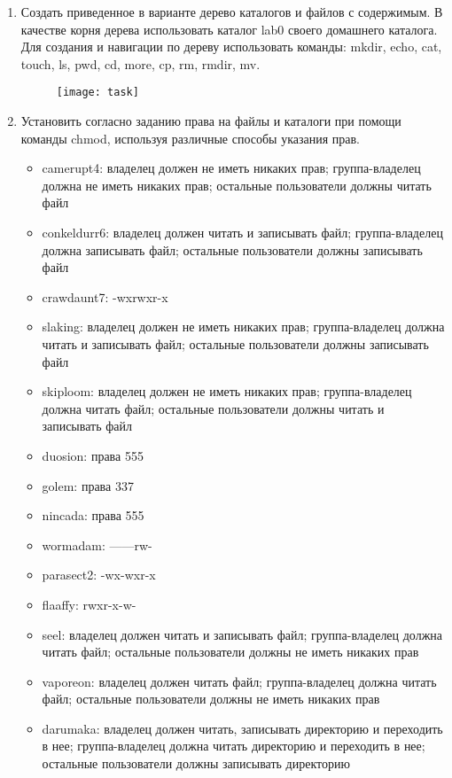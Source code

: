 \begin{enumerate}
	\item Создать приведенное в варианте дерево каталогов и файлов с содержимым. В качестве корня дерева использовать каталог lab0 своего домашнего каталога. Для создания и навигации по дереву использовать команды: mkdir, echo, cat, touch, ls, pwd, cd, more, cp, rm, rmdir, mv.
	\begin{figure}[h]
		\centering
		\texttt{[image: task]}
	\end{figure}
	
	\item Установить согласно заданию права на файлы и каталоги при помощи команды chmod, используя различные способы указания прав.
	\begin{itemize}
		\item camerupt4: владелец должен не иметь никаких прав; группа-владелец должна не иметь никаких прав; остальные пользователи должны читать файл
		 \item conkeldurr6: владелец должен читать и записывать файл; группа-владелец должна записывать файл; остальные пользователи должны записывать файл
		 \item crawdaunt7: -wxrwxr-x
		 \item slaking: владелец должен не иметь никаких прав; группа-владелец должна читать и записывать файл; остальные пользователи должны записывать файл
		 \item skiploom: владелец должен не иметь никаких прав; группа-владелец должна читать файл; остальные пользователи должны читать и записывать файл
		 \item duosion: права 555
		 \item golem: права 337
		 \item nincada: права 555
		 \item wormadam: ------rw-
		 \item parasect2: -wx-wxr-x
		 \item flaaffy: rwxr-x-w-
		 \item seel: владелец должен читать и записывать файл; группа-владелец должна читать файл; остальные пользователи должны не иметь никаких прав
		 \item vaporeon: владелец должен читать файл; группа-владелец должна читать файл; остальные пользователи должны не иметь никаких прав
		 \item darumaka: владелец должен читать, записывать директорию и переходить в нее; группа-владелец должна читать директорию и переходить в нее; остальные пользователи должны записывать директорию

\end{itemize}
\end{enumerate}
